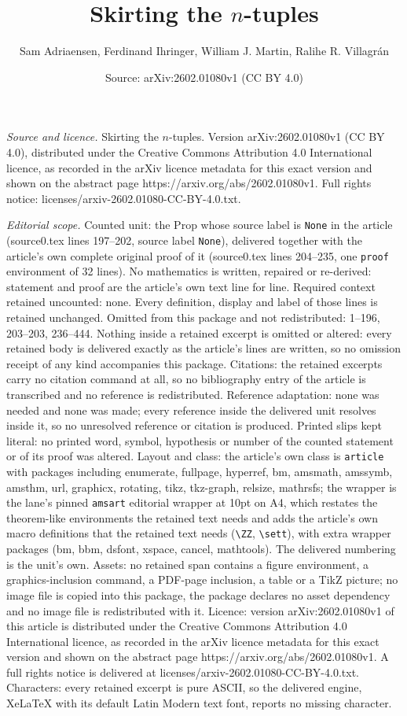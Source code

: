 \documentclass[10pt,a4paper]{amsart}
\title[Skirting the $n$-tuples]{Skirting the $n$-tuples}
\author{Sam Adriaensen, Ferdinand Ihringer, William J. Martin, Ralihe R. Villagr\'an}
\date{Source: arXiv:2602.01080v1 (CC BY 4.0)}
\begin{document}
\maketitle

\noindent\emph{Source and licence.} Skirting the $n$-tuples. Version arXiv:2602.01080v1 (CC BY 4.0), distributed under the Creative Commons Attribution 4.0 International licence, as recorded in the arXiv licence metadata for this exact version and shown on the abstract page https://arxiv.org/abs/2602.01080v1. Full rights notice: licenses/arxiv-2602.01080-CC-BY-4.0.txt.\par\smallskip

\noindent\textit{Editorial scope.} Counted unit: the Prop whose source label is \texttt{None} in the article (source0.tex lines 197--202, source label \texttt{None}), delivered together with the article's own complete original proof of it (source0.tex lines 204--235, one \texttt{proof} environment of 32 lines). No mathematics is written, repaired or re-derived: statement and proof are the article's own text line for line. Required context retained uncounted: none. Every definition, display and label of those lines is retained unchanged. Omitted from this package and not redistributed: 1--196, 203--203, 236--444. Nothing inside a retained excerpt is omitted or altered: every retained body is delivered exactly as the article's lines are written, so no omission receipt of any kind accompanies this package. Citations: the retained excerpts carry no citation command at all, so no bibliography entry of the article is transcribed and no reference is redistributed. Reference adaptation: none was needed and none was made; every reference inside the delivered unit resolves inside it, so no unresolved reference or citation is produced. Printed slips kept literal: no printed word, symbol, hypothesis or number of the counted statement or of its proof was altered. Layout and class: the article's own class is \texttt{article} with packages including enumerate, fullpage, hyperref, bm, amsmath, amssymb, amsthm, url, graphicx, rotating, tikz, tkz-graph, relsize, mathrsfs; the wrapper is the lane's pinned \texttt{amsart} editorial wrapper at 10pt on A4, which restates the theorem-like environments the retained text needs and adds the article's own macro definitions that the retained text needs (\texttt{\textbackslash ZZ}, \texttt{\textbackslash sett}), with extra wrapper packages (bm, bbm, dsfont, xspace, cancel, mathtools). The delivered numbering is the unit's own. Assets: no retained span contains a figure environment, a graphics-inclusion command, a PDF-page inclusion, a table or a TikZ picture; no image file is copied into this package, the package declares no asset dependency and no image file is redistributed with it. Licence: version arXiv:2602.01080v1 of this article is distributed under the Creative Commons Attribution 4.0 International licence, as recorded in the arXiv licence metadata for this exact version and shown on the abstract page https://arxiv.org/abs/2602.01080v1. A full rights notice is delivered at licenses/arxiv-2602.01080-CC-BY-4.0.txt. Characters: every retained excerpt is pure ASCII, so the delivered engine, XeLaTeX with its default Latin Modern text font, reports no missing character.
\end{document}
